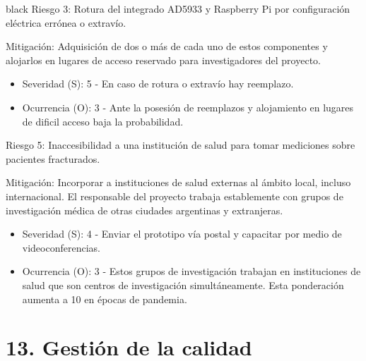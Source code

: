 \documentclass[11pt]{charter}
\begin{document}
\begin{consigna}{black}
Riesgo 3: Rotura del integrado AD5933  y Raspberry Pi por configuración eléctrica errónea o extravío.

Mitigación: Adquisición de dos o más de cada uno de estos componentes y alojarlos en lugares de acceso reservado para investigadores del proyecto.
\begin{itemize}
\item Severidad (S): 5 - En caso de rotura o extravío hay reemplazo.
\item Ocurrencia (O): 3 - Ante la posesión de reemplazos y alojamiento en lugares de dificil acceso baja la probabilidad.
\end{itemize}

Riesgo 5: Inaccesibilidad a una institución de salud para tomar mediciones sobre pacientes fracturados.

Mitigación: Incorporar a instituciones de salud externas al ámbito local, incluso internacional. El responsable del proyecto trabaja establemente con grupos de investigación médica de otras ciudades argentinas y extranjeras.
\begin{itemize}
\item Severidad (S): 4 - Enviar el prototipo vía postal y capacitar por medio de videoconferencias.
\item Ocurrencia (O): 3 - Estos grupos de investigación trabajan en instituciones de salud que son centros de investigación simultáneamente. Esta ponderación aumenta a 10 en épocas de pandemia. 
\end{itemize}

\end{consigna}

\pagebreak
\section{13. Gestión de la calidad}
\label{sec:calidad}
\end{document}
